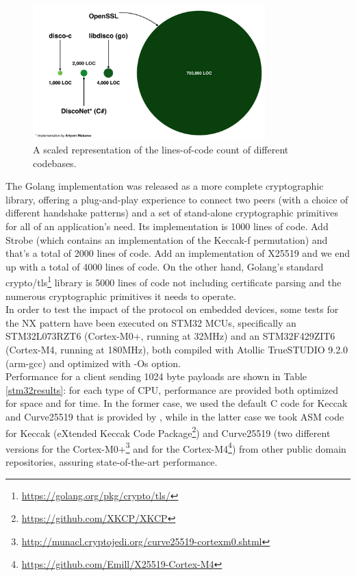 \documentclass{article}
\begin{document}
\begin{figure}[H]
\centering
\includegraphics[width=0.8\textwidth]{rwcimg/LOC.png}
\caption{A scaled representation of the lines-of-code count of different codebases.}
\label{fig:LOC}
\end{figure}

The Golang implementation was released as a more complete cryptographic library, offering a plug-and-play experience to connect two peers (with a choice of different handshake patterns) and a set of stand-alone cryptographic primitives for all of an application's need. Its implementation is 1000 lines of code. Add  Strobe (which contains an implementation of the Keccak-f permutation) and that's a total of 2000 lines of code. Add an implementation of X25519 and we end up with a total of 4000 lines of code. On the other hand, Golang's standard crypto/tls\footnote{\url{https://golang.org/pkg/crypto/tls/}} library is 5000 lines of code not including certificate parsing and the numerous cryptographic primitives it needs to operate.\\

In order to test the impact of the protocol on embedded devices, some tests for the NX pattern have been executed on STM32 MCUs, specifically an STM32L073RZT6 (Cortex-M0+, running at 32MHz) and an STM32F429ZIT6 (Cortex-M4, running at 180MHz), both compiled with Atollic TrueSTUDIO 9.2.0 (arm-gcc) and optimized with -Os option. \\

Performance for a client sending 1024 byte payloads are shown in Table \ref{stm32results}: for each type of CPU, performance are provided both optimized for space and for time. In the former case, we used the default C code for Keccak and Curve25519 that is provided by \cite{disco-c}, while in the latter case we took ASM code for Keccak (eXtended Keccak Code Package\footnote{\url{https://github.com/XKCP/XKCP}}) and Curve25519 (two different versions for the Cortex-M0+\footnote{\url{http://munacl.cryptojedi.org/curve25519-cortexm0.shtml}} and for the Cortex-M4\footnote{\url{https://github.com/Emill/X25519-Cortex-M4}}) from other public domain repositories, assuring state-of-the-art performance.
\end{document}
